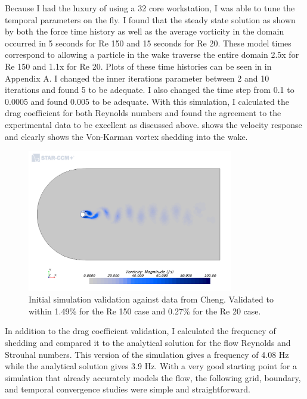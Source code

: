 \documentclass[10pt,english]{article}
\begin{document}
 Because I had the luxury of using a 32 core workstation, I was able to tune the temporal parameters on the fly.  I found that the steady state solution as shown by both the force time history as well as the average vorticity in the domain occurred in 5 seconds for Re 150 and 15 seconds for Re 20.  These model times correspond to allowing a particle in the wake traverse the entire domain 2.5x for Re 150 and 1.1x for Re 20.  Plots of these time histories can be seen in  in Appendix A.  I changed the inner iterations parameter between 2 and 10 iterations and found 5 to be adequate.  I also changed the time step from 0.1 to 0.0005 and found 0.005 to be adequate.  With this simulation, I calculated the drag coefficient for both Reynolds numbers and found the agreement to the experimental data to be excellent as discussed above.   shows the velocity response and clearly shows the Von-Karman vortex shedding into the wake. 
 
 \begin{figure}[h]
\centering
\includegraphics[trim={1.5cm 0cm 1.0cm 3cm},clip,width=0.8\textwidth]{cylinder_2_05_ScalarScene2_Re150.png}
\vspace{-5pt}
\caption{Initial simulation validation against data from Cheng. Validated to within 1.49\% for the Re 150 case and 0.27\% for the Re 20 case. }
\label{f:scalar05_1}
\end{figure}

In addition to the drag coefficient validation, I calculated the frequency of shedding and compared it to the analytical solution for the flow Reynolds and Strouhal numbers.  This version of the simulation gives a frequency of 4.08 Hz while the analytical solution gives 3.9 Hz.  With a very good starting point for a simulation that already accurately models the flow, the following grid, boundary, and temporal convergence studies were simple and straightforward.
\end{document}
